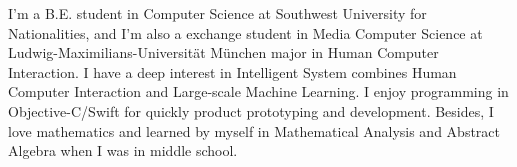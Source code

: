 
\begin{cventries}
  \cventry
    {}
    {}
    {}
    {}
    {
    I'm a B.E. student in Computer Science at Southwest University for Nationalities, and I'm also a exchange student in Media Computer Science at Ludwig-Maximilians-Universität München major in Human Computer Interaction.
    I have a deep interest in Intelligent System combines Human Computer Interaction and Large-scale Machine Learning. I enjoy programming in Objective-C/Swift for quickly product prototyping and development. Besides, I love mathematics and learned by myself in Mathematical Analysis and Abstract Algebra when I was in middle school.
    }
\end{cventries}

